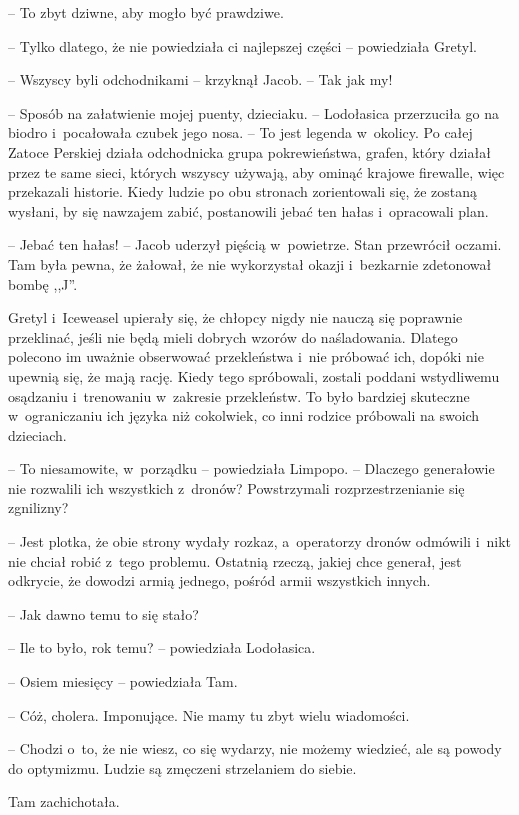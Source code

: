 \documentclass[oneside,polish,11pt,sfheadings]{mwbk}
\begin{document}
-- To zbyt dziwne, aby mogło być prawdziwe.

-- Tylko dlatego, że nie powiedziała ci najlepszej części -- powiedziała
Gretyl.

-- Wszyscy byli odchodnikami -- krzyknął Jacob. -- Tak jak my!

-- Sposób na załatwienie mojej puenty, dzieciaku. -- Lodołasica
przerzuciła go na biodro i~pocałowała czubek jego nosa. -- To jest
legenda w~okolicy. Po całej Zatoce Perskiej działa odchodnicka grupa
pokrewieństwa, grafen, który działał przez te same sieci, których
wszyscy używają, aby ominąć krajowe firewalle, więc przekazali historie.
Kiedy ludzie po obu stronach zorientowali się, że zostaną wysłani, by
się nawzajem zabić, postanowili jebać ten hałas i~opracowali plan.

-- Jebać ten hałas! -- Jacob uderzył pięścią w~powietrze. Stan przewrócił
oczami. Tam była pewna, że żałował, że nie wykorzystał okazji i~bezkarnie zdetonował bombę ,,J''. 

Gretyl i~Iceweasel upierały się, że
chłopcy nigdy nie nauczą się poprawnie przeklinać, jeśli nie będą mieli
dobrych wzorów do naśladowania. Dlatego polecono im uważnie obserwować
przekleństwa i~nie próbować ich, dopóki nie upewnią się, że mają rację.
Kiedy tego spróbowali, zostali poddani wstydliwemu osądzaniu i~trenowaniu w~zakresie przekleństw. To było bardziej skuteczne w~ograniczaniu ich języka niż cokolwiek, co inni rodzice próbowali na
swoich dzieciach.

-- To niesamowite, w~porządku -- powiedziała Limpopo. -- Dlaczego
generałowie nie rozwalili ich wszystkich z~dronów? Powstrzymali
rozprzestrzenianie się zgnilizny?

-- Jest plotka, że obie strony wydały rozkaz, a~operatorzy dronów
odmówili i~nikt nie chciał robić z~tego problemu. Ostatnią rzeczą,
jakiej chce generał, jest odkrycie, że dowodzi armią jednego, pośród
armii wszystkich innych.

-- Jak dawno temu to się stało?

-- Ile to było, rok temu? -- powiedziała Lodołasica.

-- Osiem miesięcy -- powiedziała Tam.

-- Cóż, cholera. Imponujące. Nie mamy tu zbyt wielu wiadomości.

-- Chodzi o~to, że nie wiesz, co się wydarzy, nie możemy wiedzieć, ale są
powody do optymizmu. Ludzie są zmęczeni strzelaniem do siebie.

Tam zachichotała. 
\end{document}
